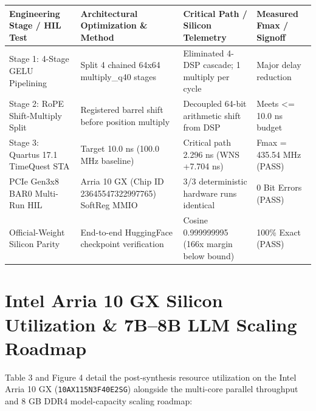 \documentclass[11pt,a4paper]{article}
\begin{document}
{\footnotesize\renewcommand{\arraystretch}{1.14}\begin{longtable}{@{}L{0.23\textwidth}L{0.27\textwidth}L{0.24\textwidth}L{0.16\textwidth}@{}}\toprule

\textbf{Engineering Stage /\allowbreak{} HIL Test} & \textbf{Architectural Optimization \& Method} & \textbf{Critical Path /\allowbreak{} Silicon Telemetry} & \textbf{Measured Fmax /\allowbreak{} Signoff}\\\midrule\endhead

Stage 1: 4-Stage GELU Pipelining & Split 4 chained 64x64 multiply\_\allowbreak{}q40 stages & Eliminated 4-DSP cascade; 1 multiply per cycle & Major delay reduction\\[2pt]

Stage 2: RoPE Shift-Multiply Split & Registered barrel shift before position multiply & Decoupled 64-bit arithmetic shift from DSP & Meets <=\allowbreak{} 10.0 ns budget\\[2pt]

Stage 3: Quartus 17.1 TimeQuest STA & Target 10.0 ns (\allowbreak{}100.0 MHz baseline)\allowbreak{} & Critical path 2.296 ns (\allowbreak{}WNS +\allowbreak{}7.704 ns)\allowbreak{} & Fmax =\allowbreak{} 435.54 MHz (\allowbreak{}PASS)\allowbreak{}\\[2pt]

PCIe Gen3x8 BAR0 Multi-Run HIL & Arria 10 GX (\allowbreak{}Chip ID 23645547\allowbreak{}32299776\allowbreak{}5)\allowbreak{} SoftReg MMIO & 3/\allowbreak{}3 deterministic hardware runs identical & 0 Bit Errors (\allowbreak{}PASS)\allowbreak{}\\[2pt]

Official-Weight Silicon Parity & End-to-end HuggingFace checkpoint verification & Cosine 0.99999999\allowbreak{}5 (\allowbreak{}166x margin below bound)\allowbreak{} & 100\% Exact (\allowbreak{}PASS)\allowbreak{}\\[2pt]

\bottomrule\end{longtable}}

\section{Intel Arria 10 GX Silicon Utilization \& 7B--8B LLM Scaling Roadmap}

Table 3 and Figure 4 detail the post-synthesis resource utilization on the Intel Arria 10 GX (\texttt{10AX115N3F40E2SG}) alongside the multi-core parallel throughput and 8 GB DDR4 model-capacity scaling roadmap:
\end{document}

